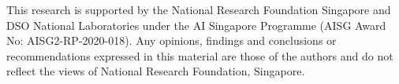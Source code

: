 \documentclass[sigconf]{acmart}
\begin{document}



\begin{acks}
This research is supported by the National Research Foundation Singapore and DSO National Laboratories under the AI Singapore Programme (AISG Award No: AISG2-RP-2020-018). 
Any opinions, findings and conclusions or recommendations expressed in this material are those of the authors and do not reflect the views of National Research Foundation, Singapore.
\end{acks}






\newpage
\appendix

\end{document}
